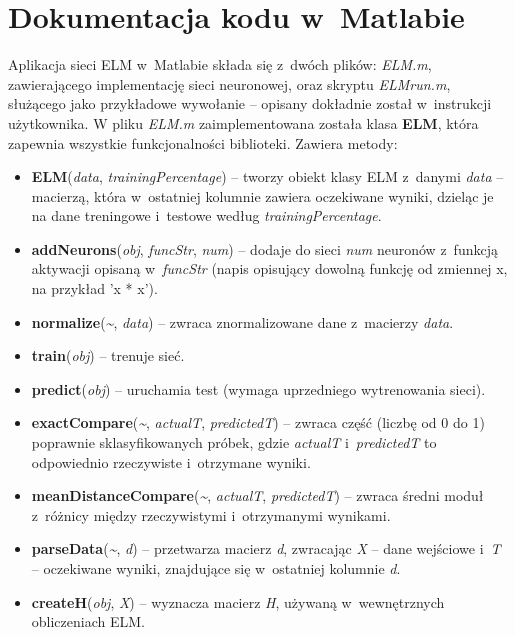 \documentclass[pl]{minipw} %
\begin{document}
\section{Dokumentacja kodu w~Matlabie}
Aplikacja sieci ELM w~Matlabie składa się z~dwóch plików: \textit{ELM.m}, zawierającego implementację sieci neuronowej, oraz skryptu \textit{ELM\textunderscore run.m}, służącego jako przykładowe wywołanie -- opisany dokładnie został w~instrukcji użytkownika.
\label{matlab-dokumentacja}
W pliku \textit{ELM.m} zaimplementowana została klasa \textbf{ELM}, która zapewnia wszystkie funkcjonalności biblioteki. Zawiera metody:
\begin{itemize}
\item \textbf{ELM}(\textit{data}, \textit{trainingPercentage}) -- tworzy obiekt klasy ELM z~danymi \textit{data} -- macierzą, która w~ostatniej kolumnie zawiera oczekiwane wyniki, dzieląc je na dane treningowe i~testowe według \textit{trainingPercentage}.
\item \textbf{addNeurons}(\textit{obj}, \textit{funcStr}, \textit{num}) -- dodaje do sieci \textit{num} neuronów z~funkcją aktywacji opisaną w~\textit{funcStr} (napis opisujący dowolną funkcję od zmiennej x, na przykład 'x * x').  
\item \textbf{normalize}(\textit{\~}, \textit{data}) -- zwraca znormalizowane dane z~macierzy \textit{data}.
\item \textbf{train}(\textit{obj}) -- trenuje sieć.
\item \textbf{predict}(\textit{obj}) -- uruchamia test (wymaga uprzedniego wytrenowania sieci).
\item \textbf{exactCompare}(\textit{\~}, \textit{actualT}, \textit{predictedT}) -- zwraca część (liczbę od 0 do 1) poprawnie sklasyfikowanych próbek, gdzie \textit{actualT} i~\textit{predictedT} to odpowiednio rzeczywiste i~otrzymane wyniki.
\item \textbf{meanDistanceCompare}(\textit{\~}, \textit{actualT}, \textit{predictedT}) -- zwraca średni moduł z~różnicy między rzeczywistymi i~otrzymanymi wynikami.
\item \textbf{parseData}(\textit{\~}, \textit{d}) -- przetwarza macierz \textit{d}, zwracając \textit{X} -- dane wejściowe i~\textit{T} -- oczekiwane wyniki, znajdujące się w~ostatniej kolumnie \textit{d}.
\item \textbf{createH}(\textit{obj}, \textit{X}) -- wyznacza macierz \textit{H}, używaną w~wewnętrznych obliczeniach ELM.
\end{itemize}
\clearpage
\end{document}
